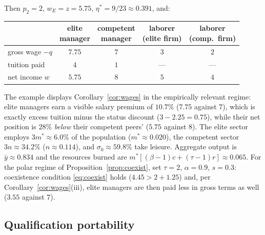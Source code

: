 \documentclass[12pt,letterpaper]{article}
\theoremstyle{definition}
\begin{document}
Then $p_2=2$, $w_E=z=5.75$, $\eta^\ast=9/23\approx 0.391$, and:
\begin{center}
{\small
\begin{tabular}{lcccc}
\toprule
 & \shortstack{elite\\manager}
 & \shortstack{competent\\manager}
 & \shortstack{laborer\\(elite firm)}
 & \shortstack{laborer\\(comp.\ firm)}\\
\midrule
gross wage $-q$ & $7.75$ & $7$ & $3$ & $2$\\
tuition paid & $4$ & $1$ & --- & ---\\
net income $w$ & $5.75$ & $8$ & $5$ & $4$\\
\bottomrule
\end{tabular}
}
\end{center}
The example displays Corollary~\ref{cor:wages} in the empirically relevant regime: elite managers earn a visible salary premium of $10.7\%$ ($7.75$ against $7$), which is exactly excess tuition minus the status discount ($3 - 2.25 = 0.75$), while their net position is $28\%$ \emph{below} their competent peers' ($5.75$ against $8$).
The elite sector employs $3m^\ast\approx 6.0\%$ of the population ($m^\ast\approx 0.020$), the competent sector $3n\approx 34.2\%$ ($n\approx 0.114$), and $\sigma_0\approx 59.8\%$ take leisure.
Aggregate output is $\bar{y}\approx 0.834$ and the resources burned are $m^\ast[(\beta-1)c+(\tau-1)r]\approx 0.065$.
For the polar regime of Proposition~\ref{prop:coexist}, set $\tau=2$, $\alpha=0.9$, $s=0.3$: coexistence condition \eqref{eq:coexist} holds ($4.45 > 2 + 1.25$) and, per Corollary~\ref{cor:wages}(iii), elite managers are then paid less in gross terms as well ($3.55$ against $7$).

\subsection{Qualification portability}
\end{document}
